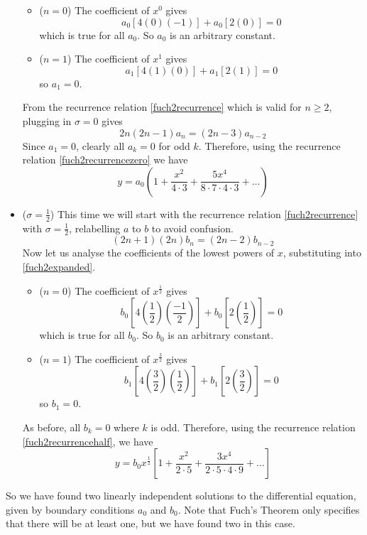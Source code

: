 \begin{example}
\begin{itemize}
			\begin{itemize}
				\item (\(n=0\)) The coefficient of \(x^0\) gives
						\[
							a_0[4(0)(-1)] + a_0[2(0)] = 0
						\]
						which is true for all \(a_0\).
						So \(a_0\) is an arbitrary constant.
				\item (\(n=1\)) The coefficient of \(x^1\) gives
						\[
							a_1[4(1)(0)] + a_1[2(1)] = 0
						\]
						so \(a_1 = 0\).
			\end{itemize}
			From the recurrence relation \eqref{fuch2recurrence} which is valid for \(n \geq 2\), plugging in \(\sigma = 0\) gives
			\begin{equation}\label{fuch2recurrencezero}
				2n(2n - 1)a_n = (2n - 3)a_{n-2}
			\end{equation}
			Since \(a_1 = 0\), clearly all \(a_k = 0\) for odd \(k\).
			Therefore, using the recurrence relation \eqref{fuch2recurrencezero} we have
			\[
				y = a_0 \left( 1 + \frac{x^2}{4 \cdot 3} + \frac{5x^4}{8\cdot 7 \cdot 4 \cdot 3} + \dots \right)
			\]

		\item (\(\sigma = \frac{1}{2}\)) This time we will start with the recurrence relation \eqref{fuch2recurrence} with \(\sigma = \frac{1}{2}\), relabelling \(a\) to \(b\) to avoid confusion.
			\begin{equation}\label{fuch2recurrencehalf}
				(2n+1)(2n)b_n = (2n-2)b_{n-2}
			\end{equation}
			Now let us analyse the coefficients of the lowest powers of \(x\), substituting into \eqref{fuch2expanded}.
			\begin{itemize}
				\item (\(n=0\)) The coefficient of \(x^{\frac{1}{2}}\) gives
						\[
							b_0\left[4\left(\frac{1}{2}\right)\left(\frac{-1}{2}\right)\right] + b_0\left[2\left(\frac{1}{2}\right)\right] = 0
						\]
						which is true for all \(b_0\).
						So \(b_0\) is an arbitrary constant.
				\item (\(n=1\)) The coefficient of \(x^{\frac{3}{2}}\) gives
						\[
							b_1\left[4\left(\frac{3}{2}\right)\left(\frac{1}{2}\right)\right] + b_1\left[2\left(\frac{3}{2}\right)\right] = 0
						\]
						so \(b_1 = 0\).
			\end{itemize}
			As before, all \(b_k = 0\) where \(k\) is odd.
			Therefore, using the recurrence relation \eqref{fuch2recurrencehalf}, we have
			\[
				y = b_0x^{\frac{1}{2}} \left[ 1 + \frac{x^2}{2 \cdot 5} + \frac{3x^4}{2 \cdot 5 \cdot 4 \cdot 9} + \dots \right]
			\]
	\end{itemize}
	So we have found two linearly independent solutions to the differential equation, given by boundary conditions \(a_0\) and \(b_0\).
	Note that Fuch's Theorem only specifies that there will be at least one, but we have found two in this case.
\end{example}

